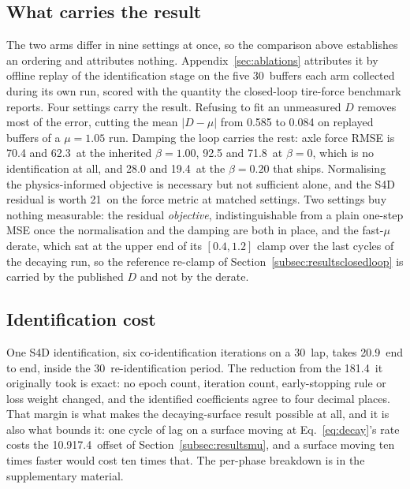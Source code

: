 \documentclass[lineno,12pt]{sn-jnl}
\makeatletter
\newif\ifsiu@prev
\DeclareRobustCommand{\siu@sep}{\ifsiu@prev\,\fi}
\DeclareRobustCommand{\siu@unit}[1]{\siu@sep\text{#1}\siu@prevtrue}
\DeclareRobustCommand{\siu@pre}[1]{\siu@sep\text{#1}\siu@prevfalse}
\DeclareRobustCommand{\siu@div}[1]{\text{#1}\siu@prevfalse}
\DeclareRobustCommand{\meter}{m}
\DeclareRobustCommand{\second}{s}
\DeclareRobustCommand{\gram}{g}
\DeclareRobustCommand{\newton}{N}
\DeclareRobustCommand{\radian}{rad}
\DeclareRobustCommand{\hertz}{Hz}
\DeclareRobustCommand{\percent}{\%}
\DeclareRobustCommand{\g}{\textit{g}}
\DeclareRobustCommand{\kilo}{k}
\DeclareRobustCommand{\milli}{m}
\DeclareRobustCommand{\per}{/}
\DeclareRobustCommand{\squared}{\ensuremath{^{2}}}
\providecommand{\degree}{\ensuremath{^{\circ}}}
\DeclareRobustCommand{\si}[1]{\begingroup
  \siu@prevfalse
  \renewcommand{\meter}{\siu@unit{m}}%
  \renewcommand{\second}{\siu@unit{s}}%
  \renewcommand{\gram}{\siu@unit{g}}%
  \renewcommand{\newton}{\siu@unit{N}}%
  \renewcommand{\radian}{\siu@unit{rad}}%
  \renewcommand{\hertz}{\siu@unit{Hz}}%
  \renewcommand{\percent}{\siu@unit{\%}}%
  \renewcommand{\degree}{\siu@unit{\ensuremath{^{\circ}}}}%
  \renewcommand{\g}{\siu@unit{\textit{g}}}%
  \renewcommand{\kilo}{\siu@pre{k}}%
  \renewcommand{\milli}{\siu@pre{m}}%
  \renewcommand{\per}{\siu@div{/}}%
  \renewcommand{\squared}{\ensuremath{^{2}}}%
  #1\endgroup}
\DeclareRobustCommand{\num}[1]{#1}
\DeclareRobustCommand{\SI}[2]{#1\,\si{#2}}
\DeclareRobustCommand{\SIrange}[3]{#1\text{--}#2\,\si{#3}}
\theoremstyle{thmstyleone}%
\theoremstyle{thmstyletwo}%
\theoremstyle{thmstylethree}%
\makeatother
\begin{document}
\subsection{What carries the result}
\label{subsec:ablations}

The two arms differ in nine settings at once, so the comparison above
establishes an ordering and attributes nothing. Appendix~\ref{sec:ablations}
attributes it by offline replay of the identification stage on the five
\SI{30}{\second} buffers each arm collected during its own run, scored with the
quantity the closed-loop tire-force benchmark reports. Four settings carry the
result. Refusing to fit an unmeasured $D$ removes most of the error, cutting the
mean $|D-\mu|$ from \num{0.585} to \num{0.084} on replayed buffers of a
$\mu=\num{1.05}$ run. Damping the loop carries the rest: axle force RMSE is
\num{70.4} and \SI{62.3}{\newton} at the inherited $\beta=\num{1.00}$,
\num{92.5} and \SI{71.8}{\newton} at $\beta=\num{0}$, which is no
identification at all, and \num{28.0} and \SI{19.4}{\newton} at the
$\beta=\num{0.20}$ that ships. Normalising the physics-informed objective is
necessary but not sufficient alone, and the S4D residual is worth
\SI{21}{\percent} on the force metric at matched settings. Two settings buy
nothing measurable: the residual \emph{objective}, indistinguishable from a
plain one-step MSE once the normalisation and the damping are both in place,
and the fast-$\mu$ derate, which sat at the upper end of its
$[\num{0.4},\num{1.2}]$ clamp over the last cycles of the decaying run, so the
reference re-clamp of Section~\ref{subsec:resultsclosedloop} is carried by the
published $D$ and not by the derate.

\subsection{Identification cost}
\label{subsec:runtime}

One S4D identification, six co-identification iterations on a \SI{30}{\second}
lap, takes \SI{20.9}{\second} end to end, inside the \SI{30}{\second}
re-identification period. The reduction from the \SI{181.4}{\second} it
originally took is exact: no epoch count, iteration count, early-stopping rule
or loss weight changed, and the identified coefficients agree to four decimal
places. That margin is what makes the decaying-surface result possible at all,
and it is also what bounds it: one cycle of lag on a surface moving at
Eq.~\eqref{eq:decay}'s rate costs the \SIrange{10.9}{17.4}{\percent} offset of
Section~\ref{subsec:resultsmu}, and a surface moving ten times faster would cost
ten times that. The per-phase breakdown is in the supplementary material.
\end{document}

